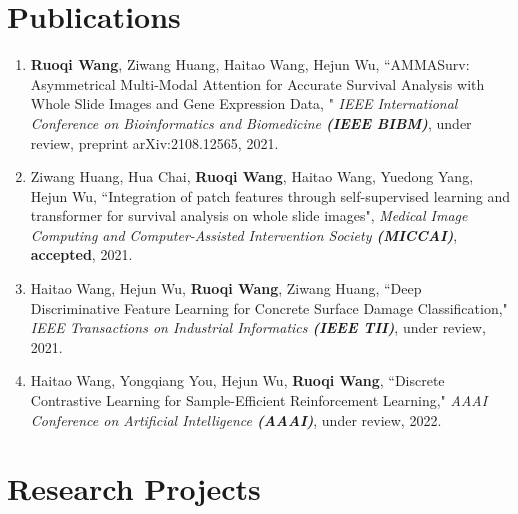 \documentclass[a4,11pt]{article}
\begin{document}
\section{\large \textbf{Publications}} 
\begin{enumerate}[itemindent=0em]
\item \textbf{Ruoqi Wang}, Ziwang Huang, Haitao Wang, Hejun Wu, ``AMMASurv: Asymmetrical Multi-Modal Attention for Accurate Survival Analysis with Whole Slide Images and Gene Expression Data, " \textit{IEEE International Conference on Bioinformatics and Biomedicine \textbf{(IEEE BIBM)}}, under review, preprint arXiv:2108.12565, 2021.

\item Ziwang Huang, Hua Chai, \textbf{Ruoqi Wang}, Haitao Wang, Yuedong Yang, Hejun Wu, ``Integration of patch features through self-supervised learning and transformer for survival analysis on whole slide images",  \textit{Medical Image Computing and Computer-Assisted Intervention Society \textbf{(MICCAI)}}, \textbf{accepted}, 2021.

\item Haitao Wang, Hejun Wu, \textbf{Ruoqi Wang}, Ziwang Huang, ``Deep Discriminative Feature Learning for Concrete Surface Damage Classification," \textit{IEEE Transactions on Industrial Informatics \textbf{(IEEE TII)}}, under review, 2021.


\item Haitao Wang, Yongqiang You, Hejun Wu, \textbf{Ruoqi Wang}, ``Discrete Contrastive Learning for Sample-Efficient Reinforcement Learning," \textit{AAAI Conference on Artificial Intelligence \textbf{(AAAI)}}, under review, 2022.
\end{enumerate}




\section{\large \textbf{Research Projects}} %

\end{document}
